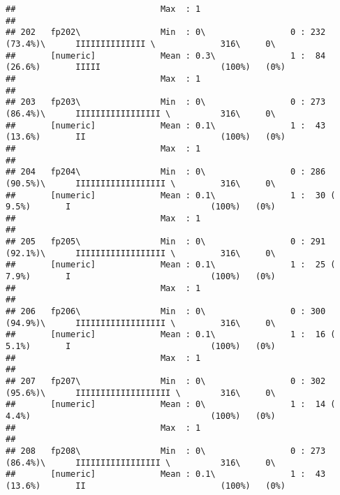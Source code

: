 \documentclass[]{article}
\begin{document}
\begin{verbatim}
##                             Max  : 1                                                                                       
## 
## 202   fp202\                Min  : 0\                 0 : 232 (73.4%)\      IIIIIIIIIIIIII \             316\     0\       
##       [numeric]             Mean : 0.3\               1 :  84 (26.6%)       IIIII                        (100%)   (0%)     
##                             Max  : 1                                                                                       
## 
## 203   fp203\                Min  : 0\                 0 : 273 (86.4%)\      IIIIIIIIIIIIIIIII \          316\     0\       
##       [numeric]             Mean : 0.1\               1 :  43 (13.6%)       II                           (100%)   (0%)     
##                             Max  : 1                                                                                       
## 
## 204   fp204\                Min  : 0\                 0 : 286 (90.5%)\      IIIIIIIIIIIIIIIIII \         316\     0\       
##       [numeric]             Mean : 0.1\               1 :  30 ( 9.5%)       I                            (100%)   (0%)     
##                             Max  : 1                                                                                       
## 
## 205   fp205\                Min  : 0\                 0 : 291 (92.1%)\      IIIIIIIIIIIIIIIIII \         316\     0\       
##       [numeric]             Mean : 0.1\               1 :  25 ( 7.9%)       I                            (100%)   (0%)     
##                             Max  : 1                                                                                       
## 
## 206   fp206\                Min  : 0\                 0 : 300 (94.9%)\      IIIIIIIIIIIIIIIIII \         316\     0\       
##       [numeric]             Mean : 0.1\               1 :  16 ( 5.1%)       I                            (100%)   (0%)     
##                             Max  : 1                                                                                       
## 
## 207   fp207\                Min  : 0\                 0 : 302 (95.6%)\      IIIIIIIIIIIIIIIIIII \        316\     0\       
##       [numeric]             Mean : 0\                 1 :  14 ( 4.4%)                                    (100%)   (0%)     
##                             Max  : 1                                                                                       
## 
## 208   fp208\                Min  : 0\                 0 : 273 (86.4%)\      IIIIIIIIIIIIIIIII \          316\     0\       
##       [numeric]             Mean : 0.1\               1 :  43 (13.6%)       II                           (100%)   (0%)     

\end{verbatim}
\end{document}

